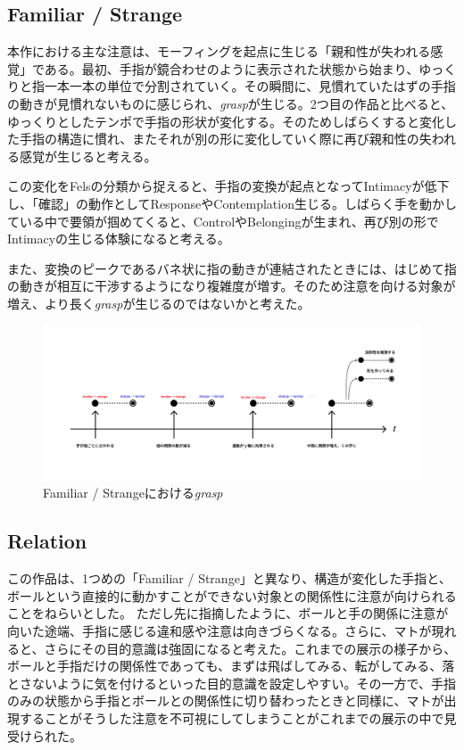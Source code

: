 \subsection*{Familiar / Strange}
本作における主な注意は、モーフィングを起点に生じる「親和性が失われる感覚」である。最初、手指が鏡合わせのように表示された状態から始まり、ゆっくりと指一本一本の単位で分割されていく。その瞬間に、見慣れていたはずの手指の動きが見慣れないものに感じられ、\textit{grasp}が生じる。2つ目の作品と比べると、ゆっくりとしたテンポで手指の形状が変化する。そのためしばらくすると変化した手指の構造に慣れ、またそれが別の形に変化していく際に再び親和性の失われる感覚が生じると考える。

この変化をFelsの分類から捉えると、手指の変換が起点となってIntimacyが低下し、「確認」の動作としてResponseやContemplation生じる。しばらく手を動かしている中で要領が掴めてくると、ControlやBelongingが生まれ、再び別の形でIntimacyの生じる体験になると考える。

また、変換のピークであるバネ状に指の動きが連結されたときには、はじめて指の動きが相互に干渉するようになり複雑度が増す。そのため注意を向ける対象が増え、より長く\textit{grasp}が生じるのではないかと考えた。

\begin{figure}[H]
  \centering
  \includegraphics[width=15cm]{img/grasp_familiar_strange.png}
  \caption{Familiar / Strangeにおける\textit{grasp}}
  \label{fig:grasp_familiar_strange}
\end{figure}

\subsection*{Relation}
この作品は、1つめの「Familiar / Strange」と異なり、構造が変化した手指と、ボールという直接的に動かすことができない対象との関係性に注意が向けられることをねらいとした。
ただし先に指摘したように、ボールと手の関係に注意が向いた途端、手指に感じる違和感や注意は向きづらくなる。さらに、マトが現れると、さらにその目的意識は強固になると考えた。これまでの展示の様子から、ボールと手指だけの関係性であっても、まずは飛ばしてみる、転がしてみる、落とさないように気を付けるといった目的意識を設定しやすい。その一方で、手指のみの状態から手指とボールとの関係性に切り替わったときと同様に、マトが出現することがそうした注意を不可視にしてしまうことがこれまでの展示の中で見受けられた。

